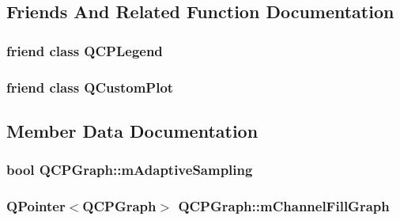 \subsection{Friends And Related Function Documentation}
\subsubsection[{\texorpdfstring{Q\+C\+P\+Legend}{QCPLegend}}]{\setlength{\rightskip}{0pt plus 5cm}friend class {\bf Q\+C\+P\+Legend}\hspace{0.3cm}{\ttfamily [friend]}}\hypertarget{classQCPGraph_a8429035e7adfbd7f05805a6530ad5e3b}{}\label{classQCPGraph_a8429035e7adfbd7f05805a6530ad5e3b}
\subsubsection[{\texorpdfstring{Q\+Custom\+Plot}{QCustomPlot}}]{\setlength{\rightskip}{0pt plus 5cm}friend class {\bf Q\+Custom\+Plot}\hspace{0.3cm}{\ttfamily [friend]}}\hypertarget{classQCPGraph_a1cdf9df76adcfae45261690aa0ca2198}{}\label{classQCPGraph_a1cdf9df76adcfae45261690aa0ca2198}


\subsection{Member Data Documentation}
\subsubsection[{\texorpdfstring{m\+Adaptive\+Sampling}{mAdaptiveSampling}}]{\setlength{\rightskip}{0pt plus 5cm}bool Q\+C\+P\+Graph\+::m\+Adaptive\+Sampling\hspace{0.3cm}{\ttfamily [protected]}}\hypertarget{classQCPGraph_aa951e78aeba714cf443be6da2e52502e}{}\label{classQCPGraph_aa951e78aeba714cf443be6da2e52502e}
\subsubsection[{\texorpdfstring{m\+Channel\+Fill\+Graph}{mChannelFillGraph}}]{\setlength{\rightskip}{0pt plus 5cm}Q\+Pointer$<${\bf Q\+C\+P\+Graph}$>$ Q\+C\+P\+Graph\+::m\+Channel\+Fill\+Graph\hspace{0.3cm}{\ttfamily [protected]}}\hypertarget{classQCPGraph_a2f1777c7accf8244fc640c33f0b04577}{}\label{classQCPGraph_a2f1777c7accf8244fc640c33f0b04577}

